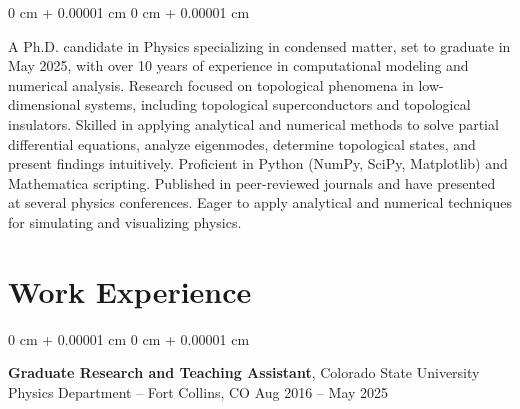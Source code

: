 \documentclass[10pt, letterpaper]{article}
\newenvironment{onecolentry}{
    \begin{adjustwidth}{
        0 cm + 0.00001 cm
    }{
        0 cm + 0.00001 cm
    }
}{
    \end{adjustwidth}
} %
\newenvironment{twocolentry}[2][]{
    \onecolentry
    \def\secondColumn{#2}
    \setcolumnwidth{\fill, 4.5 cm}
    \begin{paracol}{2}
}{
    \switchcolumn \raggedleft \secondColumn
    \end{paracol}
    \endonecolentry
} %
\begin{document}
        \begin{onecolentry}

          A Ph.D. candidate in Physics specializing in condensed matter, set to graduate in May 2025, with over 10 years of experience in computational modeling and numerical analysis.
          Research focused on topological phenomena in low-dimensional systems, including topological superconductors and topological insulators.
          Skilled in applying analytical and numerical methods to solve partial differential equations, analyze eigenmodes, determine topological states, and present findings intuitively.
          Proficient in Python (NumPy, SciPy, Matplotlib) and Mathematica scripting.
          Published in peer-reviewed journals and have presented at several physics conferences.
          Eager to apply analytical and numerical techniques for simulating and visualizing physics.

        \end{onecolentry}

    \section{Work Experience}

        \begin{twocolentry}{
            Aug 2016 – May 2025
        }
            \textbf{Graduate Research and Teaching Assistant}, Colorado State University Physics Department -- Fort Collins, CO\end{twocolentry}
\end{document}
